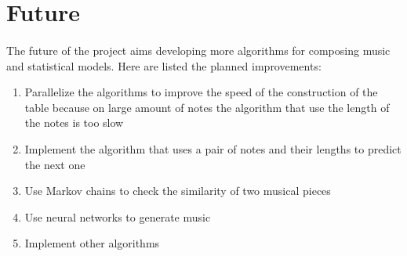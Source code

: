\documentclass[]{article}
\begin{document}
        \newpage
    \section{Future}
        \paragraph{}The future of the project aims developing more algorithms for composing music and statistical models. Here are listed the planned improvements:
        \begin{enumerate}
            \item Parallelize the algorithms to improve the speed of the construction of the table because on large amount of notes the algorithm that use the length of the notes is too slow
            \item Implement the algorithm that uses a pair of notes and their lengths to predict the next one
            \item Use Markov chains to check the similarity of two musical pieces
            \item Use neural networks to generate music
            \item Implement other algorithms
        \end{enumerate}
\end{document}
